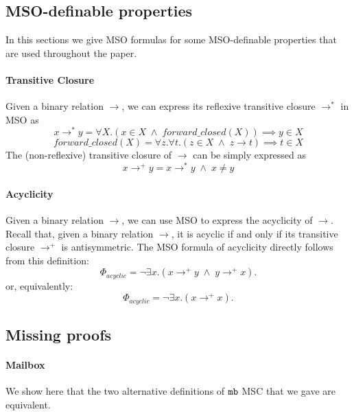 \subsection{MSO-definable properties}

In this sections we give MSO formulas for some MSO-definable properties that are used throughout the paper.

\paragraph*{Transitive Closure}
Given a binary relation $\to$, we can express its reflexive transitive closure $\to^*$ in MSO as
\[
x \to^* y = \forall X.(x \in X \;\wedge\; forward\_closed(X)) \implies y \in X
\]
\[
forward\_closed(X) = \forall z.\forall t.(z \in X \;\wedge\; z \to t) \implies t \in X
\]
The (non-reflexive) transitive closure of $\to$ can be simply expressed as
\[
x \to^+ y = x \to^* y \;\wedge\; x \neq y
\]

\paragraph*{Acyclicity} 

Given a binary relation $\to$, we can use MSO to express the acyclicity of $\to$. Recall that, given a binary relation $\to$, it is acyclic if and only if its transitive closure $\to^+$ is antisymmetric. The MSO formula of acyclicity directly follows from this definition:
\[
\Phi_{acyclic} =  \neg \exists x.(x \to^+ y \;\wedge\; y \to^+ x).   
\]
or, equivalently:
\[
\Phi_{acyclic} =  \neg \exists x.(x \to^+ x).   
\]

\subsection{Missing proofs}

\paragraph*{\bf Mailbox}

We show here that the two alternative definitions of $\mathtt{mb}$ MSC that we gave are equivalent.

